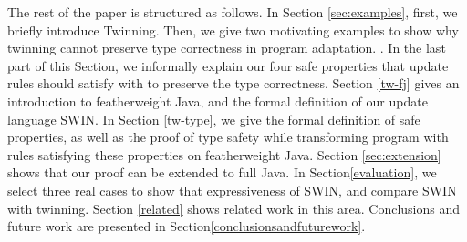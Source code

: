 The rest of the paper is structured as follows. In Section \ref{sec:examples}, first, we 
briefly introduce Twinning. Then, we give two motivating examples to show why twinning
cannot preserve type correctness in program adaptation. 
. In the last part of this Section, 
we informally explain our four safe properties that update rules should satisfy with to preserve the 
type correctness.
Section \ref{tw-fj} gives an 
introduction to featherweight Java, and the formal definition of our update language SWIN.
In Section \ref{tw-type}, we give the formal definition 
of safe properties, as well as the proof of type safety while transforming program with
rules satisfying these properties on featherweight Java.
Section \ref{sec:extension} shows that our proof can be extended to full Java.
In Section\ref{evaluation}, we select three real cases to show that expressiveness of SWIN, and
compare SWIN with twinning.
Section \ref{related} shows related work in this area. Conclusions and future work are presented
in Section\ref{conclusionsandfuturework}.



